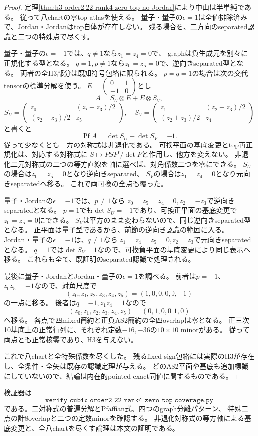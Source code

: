\begin{proof}
定理\ref{thm:h3-order2-22-rank4-zero-top-no-Jordan}により中山は半単純である。
従って八chartの零top atlasを使える。
量子・量子の$\epsilon=1$は全値排除済みで、Jordan・Jordanはtop自体が存在しない。
残る場合を、二方向のseparated認識と二つの特殊点で尽くす。

量子・量子の$\epsilon=-1$では、$q\ne1$なら$z_1=z_4=0$で、
graphは負生成元を別々に正規化する型となる。
$q=1,p\ne1$なら$z_0=z_5=0$で、逆向きseparated型となる。
両者の全H3部分は既知符号包絡に限られる。
$p=q=1$の場合は次の交代tensorの標準分解を使う。
$E=\left(\begin{smallmatrix}0&1\\-1&0\end{smallmatrix}\right)$とし
\[
 A=S_U\otimes E+E\otimes S_V,
\]
\[
 S_U=\begin{pmatrix}z_0&(z_2-z_3)/2\\(z_2-z_3)/2&z_5\end{pmatrix},\quad
 S_V=\begin{pmatrix}z_1&(z_2+z_3)/2\\(z_2+z_3)/2&z_4\end{pmatrix}
\]
と書くと
\[
 \operatorname{Pf}A=\det S_U-\det S_V=-1.
\]
従って少なくとも一方の対称式は非退化である。
可換平面の基底変更とtop再正規化は、対応する対称式に
$S\mapsto PSP^t/\det P$と作用し、他方を変えない。
非退化二元対称式の二つの等方直線を軸に選べば、対角係数二つを零にできる。
$S_U$の場合は$z_0=z_5=0$となり逆向きseparated、
$S_V$の場合は$z_1=z_4=0$となり元向きseparatedへ移る。
これで両可換の全点も覆った。

量子・Jordanの$\epsilon=-1$では、$p\ne1$なら
$z_0=z_5=z_4=0,z_2=-z_3$で逆向きseparatedとなる。
$p=1$でも$\det S_U=-1$であり、可換正平面の基底変更で$z_0=z_5=0$にできる。
$S_V$は平方のまま変わらないので、同じ逆向きseparated型となる。
正平面は量子型であるから、前節の逆向き認識の範囲に入る。
Jordan・量子の$\epsilon=-1$は、$q\ne1$なら
$z_1=z_4=z_5=0,z_2=z_3$で元向きseparatedとなる。
$q=1$では$\det S_V=1$なので、可換負平面の基底変更により同じ表示へ移る。
これらも全て、既証明のseparated認識で処理される。

最後に量子・JordanとJordan・量子の$\epsilon=1$を調べる。
前者は$p=-1$、$z_0z_5=-1$なので、対角尺度で
\[
 (z_0,z_1,z_2,z_3,z_4,z_5)=(1,0,0,0,0,-1)
\]
の一点に移る。
後者は$q=-1,z_1z_4=1$なので
\[
 (z_0,z_1,z_2,z_3,z_4,z_5)=(0,1,0,0,1,0)
\]
へ移る。
各点で四mixed簡約と正負AS2簡約の全四overlapは零となる。
正三次10基底上の正常行列に、それぞれ定数$-16,-36$の$10\times10$ minorがある。
従って両点とも正常核零であり、H3を与えない。

これで八chartと全特殊係数を尽くした。
残るfixed sign包絡には実際のH3が存在し、全条件・全矢は既存の認識定理が与える。
どのAS2平面や基底も追加標識にしていないので、結論は内在的pointed exact同値に関するものである。
\end{proof}

検証器は
\[
 \texttt{verify\_cubic\_order2\_22\_rank4\_zero\_top\_coverage.py}
\]
である。二対称式の普遍分解とPfaffian式、四つのgraph分離パターン、
特殊二点の計8overlapと二つの定数minorを確認する。
非退化対称式の等方軸による基底変更と、全八chartを尽くす論理は本文の証明である。

